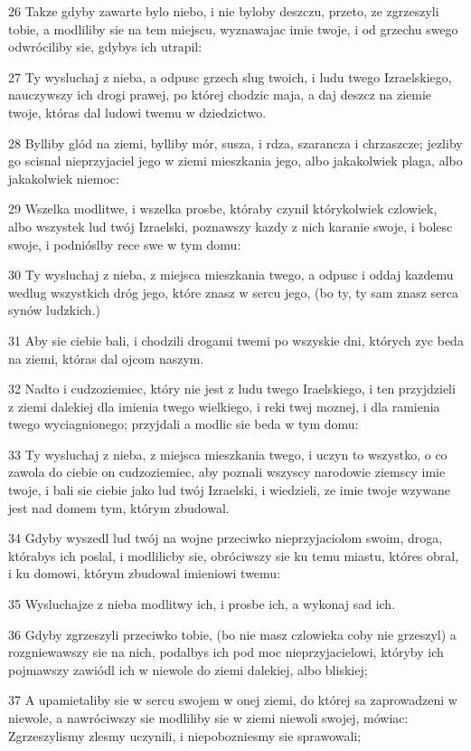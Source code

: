 \par 26 Takze gdyby zawarte bylo niebo, i nie byloby deszczu, przeto, ze zgrzeszyli tobie, a modliliby sie na tem miejscu, wyznawajac imie twoje, i od grzechu swego odwróciliby sie, gdybys ich utrapil:
\par 27 Ty wysluchaj z nieba, a odpusc grzech slug twoich, i ludu twego Izraelskiego, nauczywszy ich drogi prawej, po której chodzic maja, a daj deszcz na ziemie twoje, któras dal ludowi twemu w dziedzictwo.
\par 28 Bylliby glód na ziemi, bylliby mór, susza, i rdza, szarancza i chrzaszcze; jezliby go scisnal nieprzyjaciel jego w ziemi mieszkania jego, albo jakakolwiek plaga, albo jakakolwiek niemoc:
\par 29 Wszelka modlitwe, i wszelka prosbe, któraby czynil którykolwiek czlowiek, albo wszystek lud twój Izraelski, poznawszy kazdy z nich karanie swoje, i bolesc swoje, i podnióslby rece swe w tym domu:
\par 30 Ty wysluchaj z nieba, z miejsca mieszkania twego, a odpusc i oddaj kazdemu wedlug wszystkich dróg jego, które znasz w sercu jego, (bo ty, ty sam znasz serca synów ludzkich.)
\par 31 Aby sie ciebie bali, i chodzili drogami twemi po wszyskie dni, których zyc beda na ziemi, któras dal ojcom naszym.
\par 32 Nadto i cudzoziemiec, który nie jest z ludu twego Iraelskiego, i ten przyjdzieli z ziemi dalekiej dla imienia twego wielkiego, i reki twej moznej, i dla ramienia twego wyciagnionego; przyjdali a modlic sie beda w tym domu:
\par 33 Ty wysluchaj z nieba, z miejsca mieszkania twego, i uczyn to wszystko, o co zawola do ciebie on cudzoziemiec, aby poznali wszyscy narodowie ziemscy imie twoje, i bali sie ciebie jako lud twój Izraelski, i wiedzieli, ze imie twoje wzywane jest nad domem tym, którym zbudowal.
\par 34 Gdyby wyszedl lud twój na wojne przeciwko nieprzyjaciolom swoim, droga, którabys ich poslal, i modlilicby sie, obróciwszy sie ku temu miastu, któres obral, i ku domowi, którym zbudowal imieniowi twemu:
\par 35 Wysluchajze z nieba modlitwy ich, i prosbe ich, a wykonaj sad ich.
\par 36 Gdyby zgrzeszyli przeciwko tobie, (bo nie masz czlowieka coby nie grzeszyl) a rozgniewawszy sie na nich, podalbys ich pod moc nieprzyjacielowi, któryby ich pojmawszy zawiódl ich w niewole do ziemi dalekiej, albo bliskiej;
\par 37 A upamietaliby sie w sercu swojem w onej ziemi, do której sa zaprowadzeni w niewole, a nawróciwszy sie modliliby sie w ziemi niewoli swojej, mówiac: Zgrzeszylismy zlesmy uczynili, i niepobozniesmy sie sprawowali;
